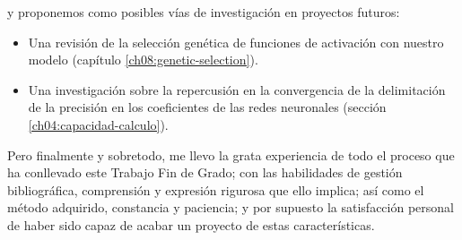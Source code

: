 y proponemos como posibles vías de investigación en proyectos futuros: 

\begin{itemize}
    \item Una revisión de la selección genética de funciones de activación con nuestro modelo (capítulo \ref{ch08:genetic-selection}).
    \item Una investigación sobre la repercusión en la convergencia de la delimitación de la precisión en los coeficientes de las redes neuronales (sección \ref{ch04:capacidad-calculo}). 
\end{itemize}

Pero finalmente y sobretodo, me llevo la grata experiencia de 
todo el proceso que ha conllevado este Trabajo Fin de Grado;
con las habilidades de gestión bibliográfica, comprensión y expresión rigurosa que ello implica;
así como el método adquirido, constancia y paciencia;
y por supuesto la satisfacción personal de haber sido capaz de acabar un proyecto 
de estas características. 


